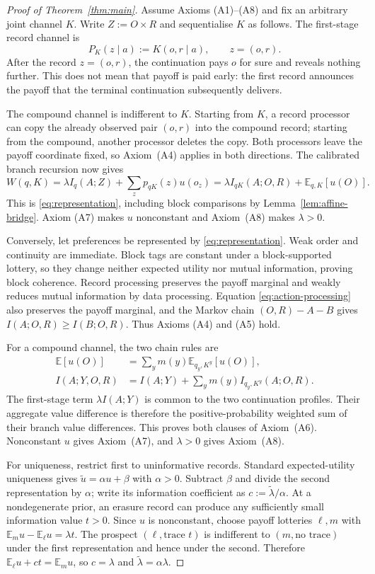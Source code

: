 \documentclass[11pt,a4paper]{article}
\theoremstyle{definition}
\newcommand{\E}{\mathbb E}
\newcommand{\I}{I}
\newcommand{\1}{\mathbf 1}
\begin{document}
\begin{proof}[Proof of Theorem~\ref{thm:main}]
Assume Axioms \textup{(A1)--(A8)} and fix an arbitrary joint channel $K$.  Write $Z:=O\times R$ and sequentialise
$K$ as follows.  The first-stage record channel is
\[
 P_K(z\mid a):=K(o,r\mid a),\qquad z=(o,r).
\]
After the record $z=(o,r)$, the continuation pays $o$ for sure and reveals nothing further.  This does not mean that
payoff is paid early: the first record announces the payoff that the terminal continuation subsequently delivers.

The compound channel is indifferent to $K$.  Starting from $K$, a record processor can copy the already observed
pair $(o,r)$ into the compound record; starting from the compound, another processor deletes the copy.  Both
processors leave the payoff coordinate fixed, so Axiom~\textup{(A4)} applies in both directions.  The calibrated
branch recursion now gives
\[
 W(q,K)
 =\lambda\I_q(A;Z)+\sum_zp_{qK}(z)u(o_z)
 =\lambda\I_{qK}(A;O,R)+\E_{q,K}[u(O)].
\]
This is \eqref{eq:representation}, including block comparisons by Lemma~\ref{lem:affine-bridge}.  Axiom
\textup{(A7)} makes $u$ nonconstant and Axiom~\textup{(A8)} makes $\lambda>0$.

Conversely, let preferences be represented by \eqref{eq:representation}.  Weak order and continuity are immediate.
Block tags are constant under a block-supported lottery, so they change neither expected utility nor mutual
information, proving block coherence.  Record processing preserves the payoff marginal and weakly reduces mutual
information by data processing.  Equation \eqref{eq:action-processing} also preserves the payoff marginal, and the
Markov chain $(O,R)-A-B$ gives $\I(A;O,R)\ge\I(B;O,R)$.  Thus Axioms \textup{(A4)} and \textup{(A5)} hold.

For a compound channel, the two chain rules are
\begin{align*}
 \E[u(O)]&=\sum_y m(y)\E_{q_y,K^y}[u(O)],\\
 \I(A;Y,O,R)&=\I(A;Y)+\sum_y m(y)\I_{q_y,K^y}(A;O,R).
\end{align*}
The first-stage term $\lambda\I(A;Y)$ is common to the two continuation profiles.  Their aggregate value difference is
therefore the positive-probability weighted sum of their branch value differences.  This proves both clauses of
Axiom~\textup{(A6)}.  Nonconstant $u$ gives Axiom~\textup{(A7)}, and $\lambda>0$ gives Axiom~\textup{(A8)}.

For uniqueness, restrict first to uninformative records.  Standard expected-utility uniqueness gives
$\widetilde u=\alpha u+\beta$ with $\alpha>0$.  Subtract $\beta$ and divide the second representation by $\alpha$;
write its information coefficient as $c:=\widetilde\lambda/\alpha$.  At a nondegenerate prior, an erasure record can
produce any sufficiently small information value $t>0$.  Since $u$ is nonconstant, choose payoff lotteries $\ell,m$
with $\E_m u-\E_\ell u=\lambda t$.  The prospect $(\ell,\text{trace }t)$ is indifferent to
$(m,\text{no trace})$ under the first representation and hence under the second.  Therefore
$\E_\ell u+ct=\E_m u$, so $c=\lambda$ and $\widetilde\lambda=\alpha\lambda$.
\end{proof}
\end{document}
